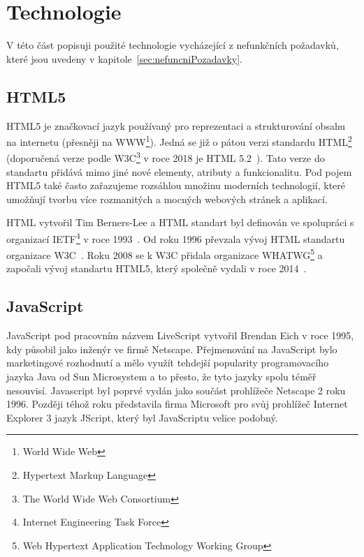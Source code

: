 
\section{Technologie}\label{sec:technologie}
V této část popisuji použité technologie vycházející z nefunkčních požadavků, které jsou uvedeny v kapitole~\ref{sec:nefuncniPozadavky}.

\subsection{HTML5}\label{subsec:html5}

HTML5 je značkovací jazyk používaný pro reprezentaci a strukturování  obsahu na internetu (přesněji na WWW\footnote{World Wide Web}).
Jedná se již o pátou verzi standardu HTML\footnote{Hypertext Markup Language} (doporučená verze podle W3C\footnote{The World Wide Web Consortium} v roce 2018 je HTML 5.2~\cite{w3c:html52}).
Tato verze do standartu přidává mimo jiné nové elementy, atributy a funkcionalitu.
Pod pojem HTML5 také často zařazujeme rozsáhlou množinu moderních technologií, které umožňují tvorbu více rozmanitých a mocných webových stránek a aplikací.~\cite{mozzila:html5}

HTML vytvořil Tim Berners-Lee a HTML standart byl definován ve spolupráci s organizací IETF\footnote{Internet Engineering Task Force} v roce 1993~\cite{html:autor}.
Od roku 1996 převzala vývoj HTML standartu organizace W3C~\cite{w3c:html32}.
Roku 2008 se k W3C přidala organizace WHATWG\footnote{Web Hypertext Application Technology Working Group} a započali vývoj standartu HTML5, který společně vydali v roce 2014~\cite{w3c:html5}.


\subsection{JavaScript}\label{subsec:javascript}

JavaScript pod pracovním názvem LiveScript vytvořil Brendan Eich v roce 1995, kdy působil jako inženýr ve firmě Netscape.
Přejmenování na JavaScript bylo marketingové rozhodnutí a mělo využít tehdejší popularity programovacího jazyka Java od Sun Microsystem a to přesto, že tyto jazyky spolu téměř nesouvisí.
Javascript byl poprvé vydán jako součást prohlížeče Netscape 2 roku 1996.
Později téhož roku představila firma Microsoft pro svůj prohlížeč Internet Explorer 3 jazyk JScript, který byl JavaScriptu velice podobný.~\cite{mozzila:javascript}

